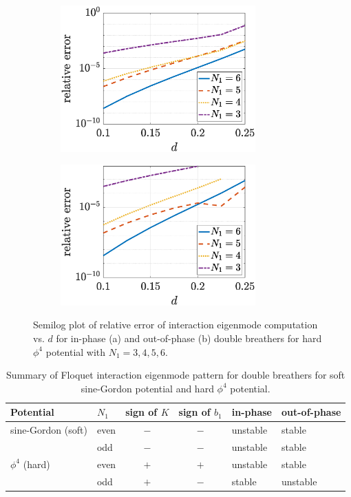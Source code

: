 \documentclass[12pt,reqno]{amsart}
\theoremstyle{definition}
\begin{document}
\begin{figure}
	\begin{center}
	\begin{subfigure}{0.45\linewidth}
		\caption{}
		\includegraphics[width=7.5cm]{images/doublephi4eigerrorpp.eps} 
		\label{fig:phi4eigerrora} 
	\end{subfigure}
	\begin{subfigure}{0.45\linewidth}
		\caption{}
		\includegraphics[width=7.5cm]{images/doublephi4eigerrorpm.eps} 
		\label{fig:phi4eigerrorb} 
	\end{subfigure}
	\end{center}
	\caption{Semilog plot of relative error of interaction eigenmode computation vs. $d$ for in-phase (a) and out-of-phase (b) double breathers for hard $\phi^4$ potential with $N_1 = 3, 4, 5, 6$.}
	\label{fig:phi4eigerror}
\end{figure}

\begin{table}
\begin{tabular}{llccll}\toprule
Potential & $N_1$ & sign of $K$ & sign of $b_1$ & in-phase & out-of-phase \\ \midrule
sine-Gordon (soft) & even & $-$ & $-$ & unstable & stable \\ 
                   & odd  & $-$ & $-$ & unstable & stable \\
$\phi^4$ (hard)    & even & $+$ & $+$ & unstable & stable \\
                   & odd  & $+$ & $-$ & stable & unstable \\ \bottomrule
\end{tabular}
\caption{Summary of Floquet interaction eigenmode pattern for double breathers for soft sine-Gordon potential and hard $\phi^4$ potential.}
\label{table:spec}
\end{table}
\end{document}
